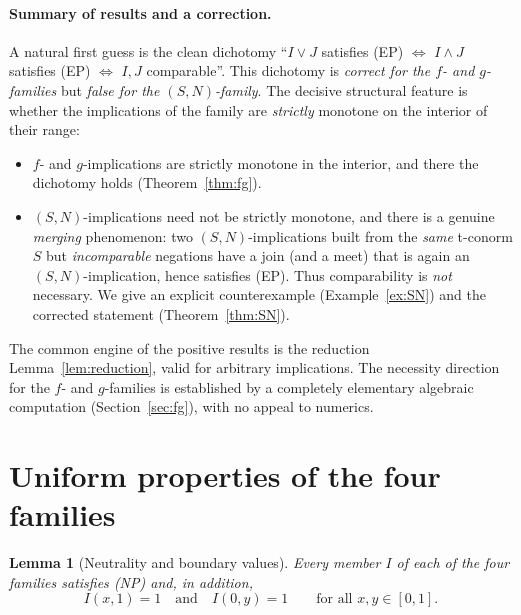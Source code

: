 \documentclass{amsart}
\theoremstyle{plain}
\newtheorem{lemma}{Lemma}
\theoremstyle{definition}
\begin{document}
\paragraph{Summary of results and a correction.}
A natural first guess is the clean dichotomy ``$I\vee J$ satisfies (EP) $\iff$ $I\wedge J$
satisfies (EP) $\iff$ $I,J$ comparable''.  This dichotomy is \emph{correct for the
$f$- and $g$-families} but \emph{false for the $(S,N)$-family}.  The decisive structural feature
is whether the implications of the family are \emph{strictly} monotone on the interior of
their range:
\begin{itemize}
\item $f$- and $g$-implications are strictly monotone in the interior, and there the
dichotomy holds (Theorem~\ref{thm:fg}).
\item $(S,N)$-implications need not be strictly monotone, and there is a genuine
\emph{merging} phenomenon: two $(S,N)$-implications built from the \emph{same} t-conorm
$S$ but \emph{incomparable} negations have a join (and a meet) that is again an
$(S,N)$-implication, hence satisfies (EP).  Thus comparability is \emph{not} necessary.
We give an explicit counterexample (Example~\ref{ex:SN}) and the corrected statement
(Theorem~\ref{thm:SN}).
\end{itemize}
The common engine of the positive results is the reduction
Lemma~\ref{lem:reduction}, valid for arbitrary implications.  The necessity direction for
the $f$- and $g$-families is established by a completely elementary algebraic computation
(Section~\ref{sec:fg}), with no appeal to numerics.

\section{Uniform properties of the four families}

\begin{lemma}[Neutrality and boundary values]\label{lem:NP}
Every member $I$ of each of the four families satisfies \textup{(NP)} and, in addition,
\begin{equation}\label{eq:topright}
I(x,1)=1\quad\text{and}\quad I(0,y)=1\qquad\text{for all }x,y\in[0,1].
\end{equation}
\end{lemma}
\end{document}
